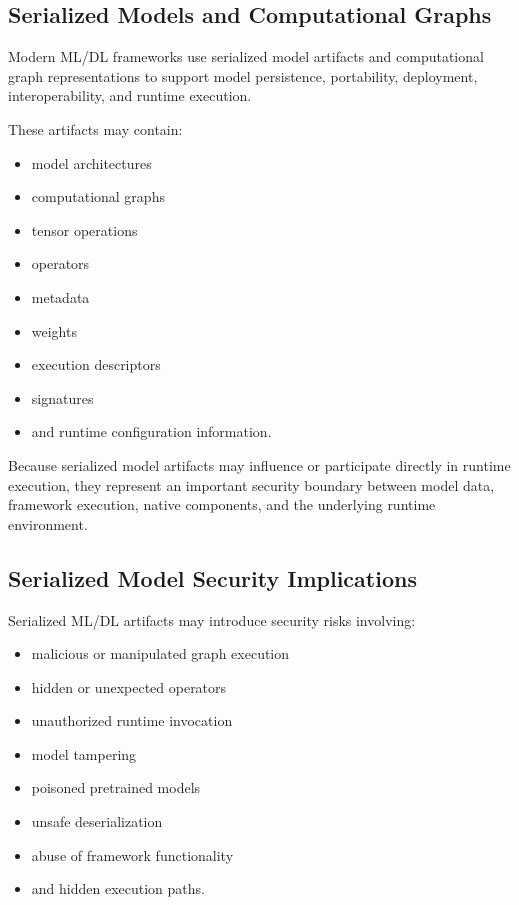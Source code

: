 \documentclass[
  12pt,
  letterpaper,
  oneside]{report}
\providecommand{\tightlist}{%
  \setlength{\itemsep}{0pt}\setlength{\parskip}{0pt}}
\begin{document}
\subsection{Serialized Models and Computational Graphs}\label{643-serialized-models-and-computational-graphs}

Modern ML/DL frameworks use serialized model artifacts and computational
graph representations to support model persistence, portability,
deployment, interoperability, and runtime execution.

These artifacts may contain:

\begin{itemize}
\tightlist
\item
  model architectures
\item
  computational graphs
\item
  tensor operations
\item
  operators
\item
  metadata
\item
  weights
\item
  execution descriptors
\item
  signatures
\item
  and runtime configuration information.
\end{itemize}

Because serialized model artifacts may influence or participate directly
in runtime execution, they represent an important security boundary
between model data, framework execution, native components, and the
underlying runtime environment.

\subsection{Serialized Model Security Implications}\label{644-serialized-model-security-implications}

Serialized ML/DL artifacts may introduce security risks involving:

\begin{itemize}
\tightlist
\item
  malicious or manipulated graph execution
\item
  hidden or unexpected operators
\item
  unauthorized runtime invocation
\item
  model tampering
\item
  poisoned pretrained models
\item
  unsafe deserialization
\item
  abuse of framework functionality
\item
  and hidden execution paths.
\end{itemize}
\end{document}
